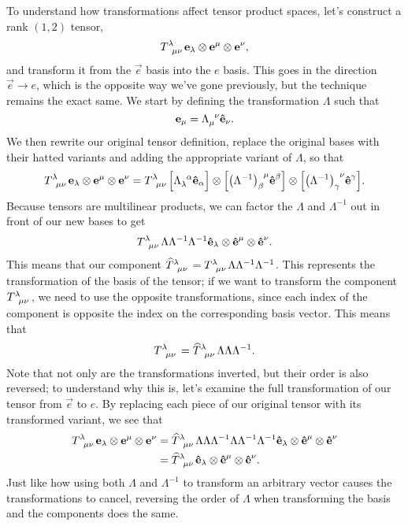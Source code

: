 To understand how transformations affect tensor product spaces, let's construct a rank $(1,2)$ tensor,
\[ \tensor{T}{^\lambda_{\mu\nu}} \vec{e}_\lambda \otimes \vec{e}^\mu \otimes \vec{e}^\nu, \]
and transform it from the $\vec{e}$ basis into the $\unit{e}$ basis.
This goes in the direction $\vec{e} \to \unit{e}$, which is the opposite way we've gone previously, but the technique remains the exact same.
We start by defining the transformation $\Lambda$ such that
\[ \vec{e}_\mu = \tensor{\Lambda}{_\mu^\nu} \unit{e}_\nu. \]
We then rewrite our original tensor definition, replace the original bases with their hatted variants and adding the appropriate variant of $\Lambda$, so that
\[ \tensor{T}{^\lambda_{\mu\nu}}\vec{e}_\lambda \otimes \vec{e}^\mu \otimes \vec{e}^\nu = \tensor{T}{^\lambda_{\mu\nu}} \Big[\tensor{\Lambda}{_\lambda^\alpha}\unit{e}_\alpha\Big] \otimes \qty[\tensor{\qty(\Lambda^{-1})}{_\beta^\mu}\unit{e}^\beta] \otimes \qty[\tensor{\qty(\Lambda^{-1})}{_\gamma^\nu}\unit{e}^\gamma]. \]
Because tensors are multilinear products, we can factor the $\Lambda$ and $\Lambda^{-1}$ out in front of our new bases to get
\[ \tensor{T}{^\lambda_{\mu\nu}}\Lambda\Lambda^{-1}\Lambda^{-1} \unit{e}_\lambda \otimes \unit{e}^\mu \otimes \unit{e}^\nu. \]
This means that our component $\tensor{\widehat{T}}{^\lambda_{\mu\nu}} = \tensor{T}{^\lambda_{\mu\nu}}\Lambda\Lambda^{-1}\Lambda^{-1}$.
This represents the transformation of the basis of the tensor; if we want to transform the component $\tensor{T}{^\lambda_{\mu\nu}}$, we need to use the opposite transformations, since each index of the component is opposite the index on the corresponding basis vector.
This means that 
\[ \tensor{T}{^\lambda_{\mu\nu}} = \tensor{\widehat{T}}{^\lambda_{\mu\nu}}\Lambda\Lambda\Lambda^{-1}. \]
Note that not only are the transformations inverted, but their order is also reversed; to understand why this is, let's examine the full transformation of our tensor from $\vec{e}$ to $\unit{e}$.
By replacing each piece of our original tensor with its transformed variant, we see that
\begin{align*}
    \tensor{T}{^\lambda_{\mu\nu}}\vec{e}_\lambda \otimes \vec{e}^\mu \otimes \vec{e}^\nu &= 
    \tensor{\widehat{T}}{^\lambda_{\mu\nu}}\Lambda\Lambda\Lambda^{-1}\Lambda\Lambda^{-1}\Lambda^{-1} \unit{e}_\lambda \otimes \unit{e}^\mu \otimes \unit{e}^\nu \\
    &= \tensor{\widehat{T}}{^\lambda_{\mu\nu}}\unit{e}_\lambda \otimes \unit{e}^\mu \otimes \unit{e}^\nu.
\end{align*}
Just like how using both $\Lambda$ and $\Lambda^{-1}$ to transform an arbitrary vector causes the transformations to cancel, reversing the order of $\Lambda$ when transforming the basis and the components does the same.

